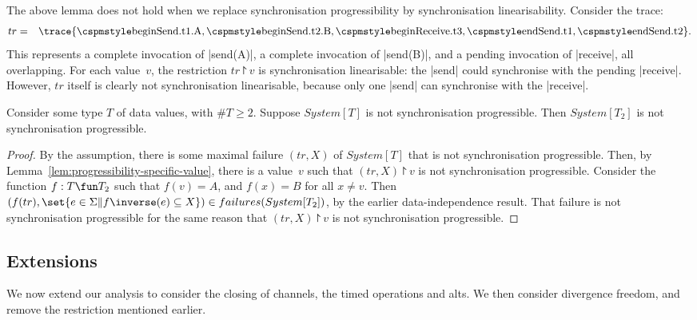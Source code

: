 \begin{note}
The above lemma does not hold when we replace synchronisation progressibility
by synchronisation linearisability.  Consider the trace:
\begin{eqnarray*}
tr &  =  &
  \trace{ \CSPMMR{beginSend.t1.A}, \CSPMMR{beginSend.t2.B}, 
    \CSPMMR{beginReceive.t3}, \CSPMMR{endSend.t1}, \CSPMMR{endSend.t2} }.
\end{eqnarray*}
This represents a complete invocation of |send(A)|, a complete invocation of
|send(B)|, and a pending invocation of |receive|, all overlapping.  For each
value~$v$, the restriction $tr \project v$ is synchronisation linearisable:
the |send| could synchronise with the pending |receive|.  However, $tr$ itself
is clearly not synchronisation linearisable, because only one |send| can
synchronise with the |receive|.
\end{note}


\begin{prop}
Consider some type $T$ of data values, with $\#T \ge 2$.  Suppose $System[T]$
is not synchronisation progressible.  Then $System[T_2]$ is not
synchronisation progressible.
\end{prop}

\begin{proof}
By the assumption, there is some maximal failure $(tr,X)$ of $System[T]$ that
is not synchronisation progressible.  Then, by
Lemma~\ref{lem:progressibility-specific-value}, there is a value~$v$ such that
$(tr,X) \project v$ is not synchronisation progressible.
%
Consider the function $f: T \fun T_2$ such that $f(v) = A$, and $f(x) = B$ for
all $x \ne v$.  Then $(f(tr), \set{e \in \Sigma \| f\inverse(e) \subseteq X})
\in failures(System[T_2])$, by the earlier data-independence result.  That
failure is not synchronisation progressible for the same reason that $(tr,X)
\project v$ is not synchronisation progressible.
\end{proof}



\subsection{Extensions}
\label{sec:di-extensions}

We now extend our analysis to consider the closing of channels, the timed
operations and alts.  We then consider divergence freedom, and remove the
restriction mentioned earlier.

